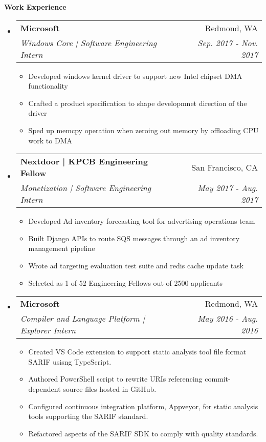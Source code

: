 \documentclass[letterpaper,10pt]{article}
\makeatletter
\newcommand{\resitem}[1]{\item #1 \vspace{-2pt}}
\newcommand{\resheading}[1]{{\large \colorbox{mygrey}{\begin{minipage}{\textwidth}{\textbf{#1 \vphantom{p\^{E}}}}\end{minipage}}}}
\newcommand{\ressubheading}[4]{
\begin{tabular*}{7.0in}{l@{\extracolsep{\fill}}r}
		\textbf{#1} & #2 \\
		\textit{#3} & \textit{#4} \\
\end{tabular*}\vspace{-6pt}}
\makeatother
\begin{document}
\resheading{Work Experience}
\begin{itemize}
\item
	\ressubheading{Microsoft}{Redmond, WA}{Windows Core | Software Engineering Intern}{Sep. 2017 - Nov. 2017}
	\begin{itemize}
    \resitem{Developed windows kernel driver to support new Intel chipset DMA functionality}
    \resitem{Crafted a product specification to shape developmnet direction of the driver}
    \resitem{Sped up memcpy operation when zeroing out memory by offloading CPU work to DMA}
	\end{itemize}
\item
	\ressubheading{Nextdoor | KPCB Engineering Fellow}{San Francisco, CA}{Monetization | Software Engineering Intern}{May 2017 - Aug. 2017}
	\begin{itemize}
		\resitem{Developed Ad inventory forecasting tool for advertising operations team}
		\resitem{Built Django APIs to route SQS messages through an ad inventory management pipeline}
		\resitem{Wrote ad targeting evaluation test suite and redis cache update task}
		\resitem{Selected as 1 of 52 Engineering Fellows out of 2500 applicants}
	\end{itemize}
\item
	\ressubheading{Microsoft}{Redmond, WA}{Compiler and Language Platform | Explorer Intern}{May 2016 - Aug. 2016}
	\begin{itemize}
		\resitem{Created VS Code extension to support static analysis tool file format SARIF usisng TypeScript.}
	  \resitem{Authored PowerShell script to rewrite URIs referencing commit-dependent source files hosted in GitHub.}
		\resitem{Configured continuous integration platform, Appveyor, for static analysis tools supporting the SARIF standard.}
		\resitem{Refactored aspects of the SARIF SDK to comply with quality standards.}
	\end{itemize}
\end{itemize}
\end{document}
